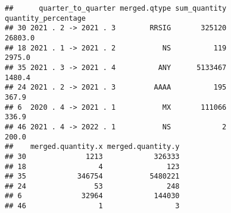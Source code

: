 \documentclass[
]{article}
\begin{document}
\begin{verbatim}
##      quarter_to_quarter merged.qtype sum_quantity quantity_percentage
## 30 2021 . 2 -> 2021 . 3        RRSIG       325120             26803.0
## 18 2021 . 1 -> 2021 . 2           NS          119              2975.0
## 35 2021 . 3 -> 2021 . 4          ANY      5133467              1480.4
## 24 2021 . 2 -> 2021 . 3         AAAA          195               367.9
## 6  2020 . 4 -> 2021 . 1           MX       111066               336.9
## 46 2021 . 4 -> 2022 . 1           NS            2               200.0
##    merged.quantity.x merged.quantity.y
## 30              1213            326333
## 18                 4               123
## 35            346754           5480221
## 24                53               248
## 6              32964            144030
## 46                 1                 3
\end{verbatim}
\end{document}
